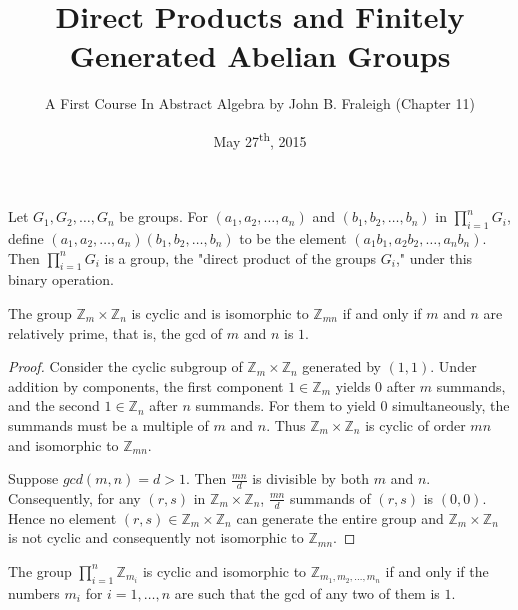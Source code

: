 \documentclass[a4paper,11pt]{article}
\title{Direct Products and Finitely Generated Abelian Groups}
\author{A First Course In Abstract Algebra by John B. Fraleigh (Chapter 11)}
\date{May 27\textsuperscript{th}, 2015}
\begin{document}
\maketitle
{}

\begin{outline}

    Let \(G_{1}, G_{2}, \ldots, G_{n}\) be groups. For \((a_{1}, a_{2}, \ldots, a_{n})\) and
    \((b_{1}, b_{2}, \ldots, b_{n})\) in \(\prod_{i=1}^{n} G_{i}\), define \((a_{1}, a_{2}, \ldots, 
    a_{n})(b_{1},  b_{2}, \ldots, b_{n})\) to be the element \((a_{1}b_{1}, a_{2}b_{2}, \ldots, a_{n}b_{n})\). Then 
    \(\prod_{i=1}^{n} G_{i}\) is a group, the "direct product of the groups \(G_{i}\)," under this binary operation.
    
    The group \(\mathbb{Z}_{m} \times \mathbb{Z}_{n}\) is cyclic and is isomorphic to 
    \(\mathbb{Z}_{mn}\) if and only if \(m\) and \(n\) are relatively prime, that is, the gcd of \(m\) and \(n\)
    is \(1\).
    
    \begin{proof}
      \forward 
        Consider the cyclic subgroup of \(\mathbb{Z}_{m} \times \mathbb{Z}_{n}\) generated 
        by \((1, 1)\). Under addition by components, the first component \(1 \in \mathbb{Z}_{m}\) yields \(0\) 
        after \(m\) summands, and the second \(1 \in \mathbb{Z}_{n}\) after \(n\) summands. For them to 
        yield \(0\) simultaneously, the summands must be a multiple of \(m\) and \(n\). Thus 
        \(\mathbb{Z}_{m} \times \mathbb{Z}_{n}\) is cyclic of order \(mn\) and isomorphic to \(\mathbb{Z}_{mn}\).
        
      \backward 
        Suppose \(gcd(m, n) = d > 1\). Then \(\frac{mn}{d}\) is divisible by both \(m\) and \(n\). 
        Consequently, for any \((r, s)\) in \(\mathbb{Z}_{m} \times \mathbb{Z}_{n}\), \(\frac{mn}{d}\) summands
        of \((r, s)\) is \((0, 0)\). Hence no element \((r, s) \in \mathbb{Z}_{m} \times \mathbb{Z}_{n}\) can
        generate the entire group and \(\mathbb{Z}_{m} \times \mathbb{Z}_{n}\) is not cyclic and consequently not
        isomorphic to \(\mathbb{Z}_{mn}\).
        
    \end{proof}
    
    The group \(\prod_{i=1}^{n} \mathbb{Z}_{m_{i}}\) is cyclic and isomorphic to \(\mathbb{Z}_{m_{1}, 
    m_{2}, \ldots, m_{n}}\) if and only if the numbers \(m_{i}\) for \(i = 1, \ldots, n\) are such that 
    the gcd of any two of them is \(1\).
    

\end{outline}
\end{document}
